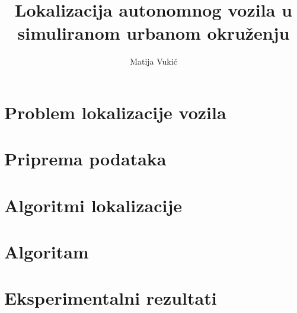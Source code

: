 \documentclass[times, utf8, diplomski]{fer}
\begin{document}

\title{Lokalizacija autonomnog vozila u simuliranom urbanom okruženju}

\author{Matija Vukić}

\maketitle

\izvornik


\tableofcontents

\chapter{Problem lokalizacije vozila}

\chapter{Priprema podataka}

\chapter{Algoritmi lokalizacije}

\chapter{Algoritam}

\chapter{Eksperimentalni rezultati}
\end{document}
